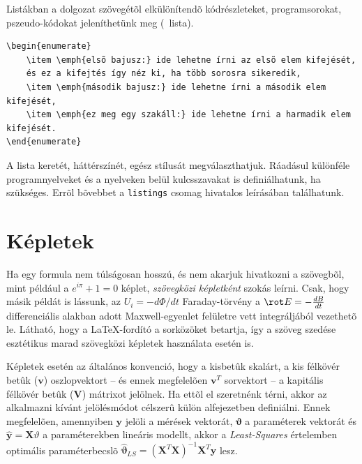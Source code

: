 Listákban a dolgozat szövegétõl elkülönítendõ kódrészleteket, programsorokat, pszeudo-kódokat jeleníthetünk meg (~lista). 
\begin{lstlisting}[frame=single,float=!ht,caption=A fenti számozott felsorolás \LaTeX- forráskódja, label=listing:Example]
\begin{enumerate}
	\item \emph{elsõ bajusz:} ide lehetne írni az elsõ elem kifejését, 
	és ez a kifejtés így néz ki, ha több sorosra sikeredik,
	\item \emph{második bajusz:} ide lehetne írni a második elem kifejését,
	\item \emph{ez meg egy szakáll:} ide lehetne írni a harmadik elem kifejését.
\end{enumerate}
\end{lstlisting}
A lista keretét, háttérszínét, egész stílusát megválaszthatjuk. Ráadásul különféle programnyelveket és a nyelveken belül kulcsszavakat is definiálhatunk, ha szükséges. Errõl bõvebbet a \verb+listings+ csomag hivatalos leírásában találhatunk.

\section{Képletek}
Ha egy formula nem túlságosan hosszú, és nem akarjuk hivatkozni a szövegbõl, mint például a $e^{i\pi}+1=0$ képlet, \emph{szövegközi képletként} szokás leírni. Csak, hogy másik példát is lássunk, az $U_i=-d\Phi/dt$ Faraday-törvény a $\rot E=-\frac{dB}{dt}$ differenciális alakban adott Maxwell-egyenlet felületre vett integráljából vezethetõ le. Látható, hogy a \LaTeX-fordító a sorközöket betartja, így a szöveg szedése esztétikus marad szövegközi képletek használata esetén is.

Képletek esetén az általános konvenció, hogy a kisbetûk skalárt, a kis félkövér betûk ($\mathbf{v}$) oszlopvektort -- és ennek megfelelõen $\mathbf{v}^T$ sorvektort -- a kapitális félkövér betûk ($\mathbf{V}$) mátrixot jelölnek. Ha ettõl el szeretnénk térni, akkor az alkalmazni kívánt jelölésmódot célszerû külön alfejezetben definiálni. Ennek megfelelõen, amennyiben $\mathbf{y}$ jelöli a mérések vektorát, $\mathbf{\vartheta}$ a paraméterek vektorát és $\hat{\mathbf{y}}=\mathbf{X}\vartheta$ a paraméterekben lineáris modellt, akkor a \emph{Least-Squares} értelemben optimális paraméterbecslõ $\hat{\mathbf{\vartheta}}_{LS}=(\mathbf{X}^T\mathbf{X})^{-1}\mathbf{X}^T\mathbf{y}$ lesz.


